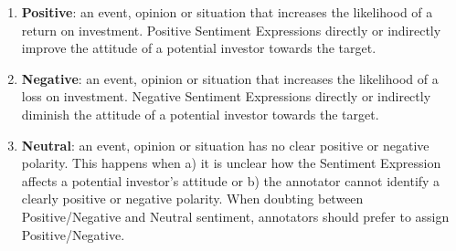\begin{enumerate}[label=\alph*), leftmargin=*] \label{step:polarity}%
    \item \textbf{Positive}: an event, opinion or situation that increases the likelihood of a return on investment.
    Positive Sentiment Expressions directly or indirectly improve the attitude of a potential investor towards the target.
    \item \textbf{Negative}: an event, opinion or situation that increases the likelihood of a loss on investment.
    Negative Sentiment Expressions directly or indirectly diminish the attitude of a potential investor towards the target.
    \item \textbf{Neutral}: an event, opinion or situation has no clear positive or negative polarity.
    This happens when a) it is unclear how the Sentiment Expression affects a potential investor's attitude or b) the annotator cannot identify a clearly positive or negative polarity.
    When doubting between Positive/Negative and Neutral sentiment, annotators should prefer to assign Positive/Negative.
\end{enumerate}

